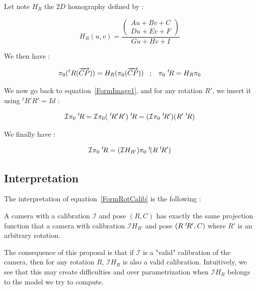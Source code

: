 Let note $H_R$ the $2D$  homography defined by :

\begin{equation}
 H_R(u,v) =  \frac{\begin{pmatrix} Au+Bv+C \\  Du+Ev+F  \end{pmatrix}} {Gu+Hv+I}
\end{equation}

We then have :

\begin{equation}
	\pi_0(^t R(\overrightarrow{CP}))  = H_R  (\pi_0 (\overrightarrow{CP}))
\;\;\;  ;  \;\;\;
        \pi_0  \; ^{t} \!  R = H_R  \pi_0
	\label{RotHomog}
\end{equation}

We now go back to equation~\ref{FormImage1}, and for any rotation $R'$, we insert it using $^t R'R'=Id$ :

\begin{equation}
	\mathcal{I} \pi_0   \; ^{t} \! R = \mathcal{I}  \pi_0   (\; ^{t} \! R' R')  \; ^{t} \! R = ( \mathcal{I}  \pi_0   \; ^{t} \! R')  (R' \; ^{t} \! R )
\end{equation}

We finally have :

\begin{equation}
	   \mathcal{I} \pi_0   \; ^{t} \! R 
	   = (\mathcal{I} H_{R'})   \pi_0   \; ^{t} \! (R \; ^{t} \! R')  \label{FormRotCalib}
\end{equation}



\subsection{Interpretation}

The interpretation of equation~\ref{FormRotCalib} is the following : 

\begin{proposal}  \;
A camera with
a calibration $\mathcal{I}$ and pose $(R,C)$ has exactly the same projection
function that a camera with calibration $\mathcal{I} H_{R'}$ and pose $(R \; ^{t} \! R',C)$ where $R'$
is an arbitrary rotation.
\end{proposal}

The consequence of this proposal is that if $\mathcal{I}$ is a "valid" calibration of the
camera, then for any rotation $R$,  $\mathcal{I} H_{R}$ is also a valid calibration.
Intuitively, we see that this may create difficulties and over parametrization when
 $\mathcal{I} H_{R}$ belongs to the model we try to compute.

